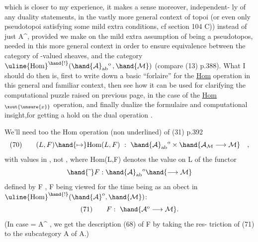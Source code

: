 
which is closer to my experience, it makes a sense moreover, independent-%
ly of any duality statements, in the vastly more general context of
topoi  (or even only pseudotopoi satisfying some mild
extra conditions, cf section 104 C)) instead of just A\^{}, provided we
\margin{$\times$}make on  the mild extra assumption of being a pseudotopos, needed in
this more general context in order to ensure equivalence between the
category  of -valued sheaves, and the category  $\uline{\mathrm{Hom}}^{\hand{!}}(\hand{\mathcal{A}}_{\mathrm{ab}}{}^{\mathrm{o}}\,,\hand{\mathcal{M}})$
(compare (13) p.388). What I should do then is, first to write down
a basic ``forlaire'' for the \uline{Hom} operation in this general and familiar
context, then see how it can be used for clarifying the computational
puzzle raised on previous page, in the case of the \uline{Hom}$_{\xout{\unsure{x}}}$ operation, and
finally dualize the formulaire and computational insight,for getting a
hold on the dual operation \hand{$\circledast$} .

We'll need too the Hom operation (non underlined) of (31) p.392
\[
(70)\qquad (L,F)\hand{\mapsto}\mathrm{Hom}(L,F) \ : \ \hand{\mathcal{A}}_{\mathrm{ab}}{}^{\mathrm{o}}\times\hand{\mathcal{A}_{\mathcal{M}}\longrightarrow\mathcal{M}} \quad ,
\]
with values in , not , where Hom(L,F) denotes the value on L
of the functor
\[
\hand{\widetilde{\ }}F : \hand{\mathcal{A}}_{\mathrm{ab}}{}^{\mathrm{o}}\hand{\longrightarrow\mathcal{M}}
\]
defined by F , F being viewed for the time being as an obect in
$\uline{\mathrm{Hom}}^{\hand{!}}(\hand{\mathcal{A}}^{\mathrm{o}},\hand{\mathcal{M}})$:
\[
(71)\qquad F:\ \hand{\mathcal{A}^{\mathrm{o}}\longrightarrow\mathcal{M}}.
\]
(In case  = A\^{} , we get the description (68) of F by taking the res-%
triction of (71) to the subcategory A of A\unsure{\^{}}.)

